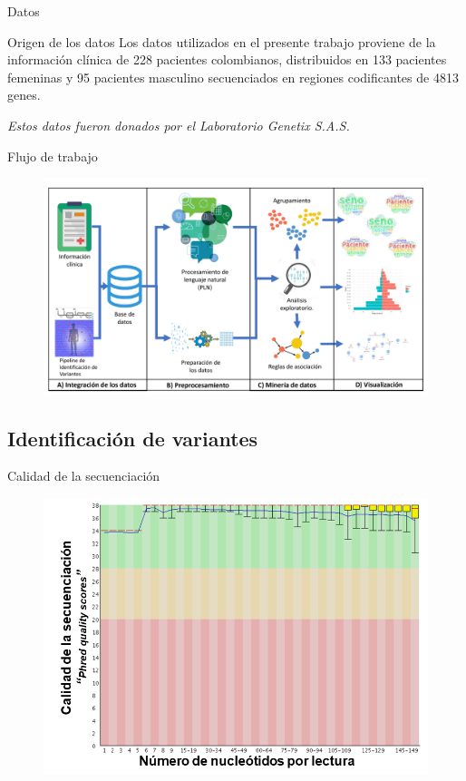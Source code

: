 \documentclass[xcolor=dvipsnames]{beamer}
\begin{document}
\begin{frame}{Datos}

\begin{block}{Origen de los datos}
	{\justifying 
		Los datos utilizados en el presente trabajo proviene de la información clínica de 228 pacientes colombianos, distribuidos en 133 pacientes femeninas y 95 pacientes masculino secuenciados en regiones codificantes de 4813 genes. 
	}
\end{block}

\textit{Estos datos fueron donados por el Laboratorio Genetix S.A.S.}
\end{frame}

\begin{frame}{Flujo de trabajo}
\begin{figure}
\includegraphics[width=1\textwidth]{KDDtesis.pdf}
\end{figure}
\end{frame}


\subsection{Identificación de variantes}

\begin{frame}{Calidad de la secuenciación}
	\begin{figure}
		\centering
		\includegraphics[width=0.8\linewidth]{calidadfastq.png}
		\label{fig:fastq2}
	\end{figure}
\end{frame}
\end{document}
